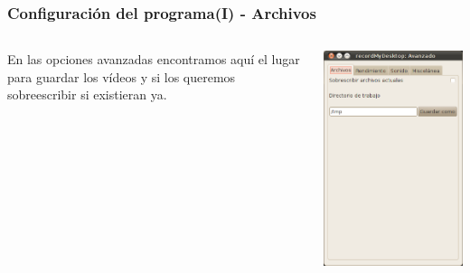 \documentclass{beamer}
\begin{document}
		\begin{frame}	
			\frametitle{Configuración del programa(I) - Archivos}
			\begin{columns}
				\begin{column}[l]{5cm}
					\justifying 
					En las opciones avanzadas encontramos aquí el lugar para guardar los vídeos y si los queremos sobreescribir si existieran ya.
				\end{column}
				\begin{column}[r]{5cm}
					\includegraphics[height=0.8\textheight, keepaspectratio=true]{Imagenes/Interfaz/02.png}
				\end{column}
			\end{columns}
		\end{frame}
\end{document}
